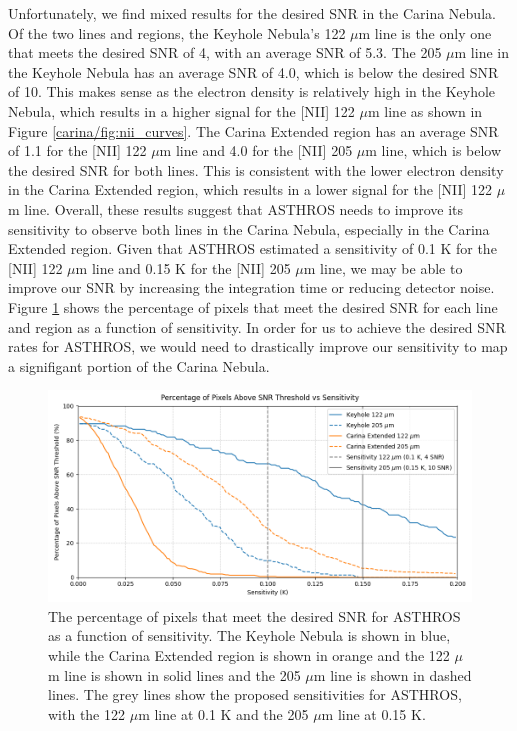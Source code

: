 Unfortunately, we find mixed results for the desired SNR in the Carina Nebula. 
Of the two lines and regions, the Keyhole Nebula's 122 $\mu$m line is the only one that meets the desired SNR of 4, with an average SNR of 5.3.
The 205 $\mu$m line in the Keyhole Nebula has an average SNR of 4.0, which is below the desired SNR of 10.
This makes sense as the electron density is relatively high in the Keyhole Nebula, which results in a higher signal for the [NII] 122 $\mu$m line as shown in Figure \ref{carina/fig:nii_curves}.
The Carina Extended region has an average SNR of 1.1 for the [NII] 122 $\mu$m line and 4.0 for the [NII] 205 $\mu$m line, which is below the desired SNR for both lines.
This is consistent with the lower electron density in the Carina Extended region, which results in a lower signal for the [NII] 122 $\mu$m line.
Overall, these results suggest that ASTHROS needs to improve its sensitivity to observe both lines in the Carina Nebula, especially in the Carina Extended region.
Given that ASTHROS estimated a sensitivity of 0.1 K for the [NII] 122 $\mu$m line and 0.15 K for the [NII] 205 $\mu$m line, we may be able to improve our SNR by increasing the integration time or reducing detector noise.
Figure \ref{carina/fig:snrpercent} shows the percentage of pixels that meet the desired SNR for each line and region as a function of sensitivity.
In order for us to achieve the desired SNR rates for ASTHROS, we would need to drastically improve our sensitivity to map a signifigant portion of the Carina Nebula.

\begin{figure}
    \centering
    \includegraphics[width=.9\textwidth]{figs/carina/snr_percent.png}
    \caption[Percentage of Pixels Meeting Desired SNR for ASTHROS]{
        The percentage of pixels that meet the desired SNR for ASTHROS as a function of sensitivity.
        The Keyhole Nebula is shown in blue, while the Carina Extended region is shown in orange and the 122 $\mu$m line is shown in solid lines and the 205 $\mu$m line is shown in dashed lines.
        The grey lines show the proposed sensitivities for ASTHROS, with the 122 $\mu$m line at 0.1 K and the 205 $\mu$m line at 0.15 K.
        }
    \label{carina/fig:snrpercent}
\end{figure}